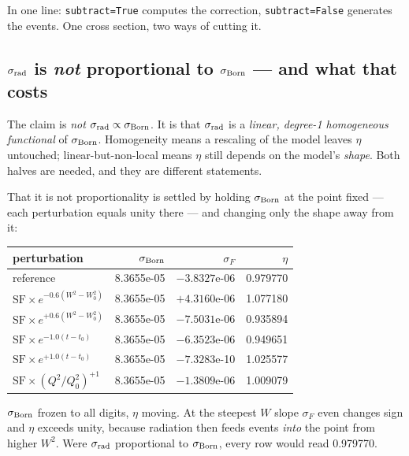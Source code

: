 \documentclass[11pt]{article}
\begin{document}
In one line: \texttt{subtract=True} computes the correction, \texttt{subtract=False} generates the
events. One cross section, two ways of cutting it.

\subsection*{\texorpdfstring{$\sigma_{\rm rad}$}{sigma rad} is \emph{not} proportional to
\texorpdfstring{$\sigma_{\rm Born}$}{sigma Born} --- and what that costs}

The claim is \emph{not} $\sigma_{\rm rad}\propto\sigma_{\rm Born}$. It is that $\sigma_{\rm rad}$ is a
\emph{linear, degree-1 homogeneous functional} of $\sigma_{\rm Born}$. Homogeneity means a rescaling
of the model leaves $\eta$ untouched; linear-but-non-local means $\eta$ still depends on the model's
\emph{shape}. Both halves are needed, and they are different statements.

That it is not proportionality is settled by holding $\sigma_{\rm Born}$ at the point fixed --- each
perturbation equals unity there --- and changing only the shape away from it:

\begin{center}\small
\begin{tabular}{lrrr}
\toprule
perturbation & $\sigma_{\rm Born}$ & $\sigma_F$ & $\eta$ \\
\midrule
reference & 8.3655e-05 & $-3.8327$e-06 & 0.979770 \\
$\mathrm{SF}\times e^{-0.6(W^2-W^2_0)}$ & 8.3655e-05 & $+4.3160$e-06 & 1.077180 \\
$\mathrm{SF}\times e^{+0.6(W^2-W^2_0)}$ & 8.3655e-05 & $-7.5031$e-06 & 0.935894 \\
$\mathrm{SF}\times e^{-1.0(t-t_0)}$ & 8.3655e-05 & $-6.3523$e-06 & 0.949651 \\
$\mathrm{SF}\times e^{+1.0(t-t_0)}$ & 8.3655e-05 & $-7.3283$e-10 & 1.025577 \\
$\mathrm{SF}\times (Q^2/Q^2_0)^{+1}$ & 8.3655e-05 & $-1.3809$e-06 & 1.009079 \\
\bottomrule
\end{tabular}
\end{center}

$\sigma_{\rm Born}$ frozen to all digits, $\eta$ moving. At the steepest $W$ slope $\sigma_F$ even
changes sign and $\eta$ exceeds unity, because radiation then feeds events \emph{into} the point from
higher $W^2$. Were $\sigma_{\rm rad}$ proportional to $\sigma_{\rm Born}$, every row would read
0.979770.
\end{document}
